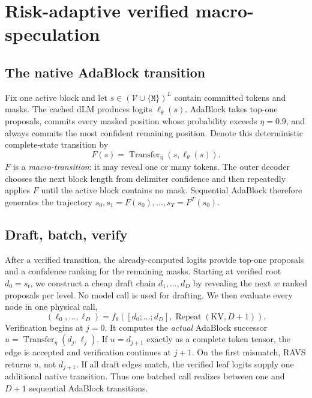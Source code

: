 \documentclass{article}
\newcommand{\method}{\textsc{RAVS}\xspace}
\begin{document}
\section{Risk-adaptive verified macro-speculation}

\subsection{The native AdaBlock transition}

Fix one active block and let $s\in(\mathcal V\cup\{\mathtt{M}\})^L$ contain committed tokens and
masks. The cached dLM produces logits $\ell_\theta(s)$. AdaBlock takes top-one proposals, commits
every masked position whose probability exceeds $\eta=0.9$, and always commits the most confident
remaining position. Denote this deterministic complete-state transition by
\begin{equation}
 F(s)=\operatorname{Transfer}_{\eta}\!\left(s,\ell_\theta(s)\right).
 \label{eq:transition}
\end{equation}
$F$ is a \emph{macro-transition}: it may reveal one or many tokens. The outer decoder chooses the
next block length from delimiter confidence and then repeatedly applies $F$ until the active block
contains no mask. Sequential AdaBlock therefore generates the trajectory
$s_0,s_1=F(s_0),\ldots,s_T=F^T(s_0)$.

\subsection{Draft, batch, verify}

After a verified transition, the already-computed logits provide top-one proposals and a confidence
ranking for the remaining masks. Starting at verified root $d_0=s_t$, we construct a cheap draft
chain $d_1,\ldots,d_D$ by revealing the next $w$ ranked proposals per level. No model call is used
for drafting. We then evaluate every node in one physical call,
\begin{equation}
 (\ell_0,\ldots,\ell_D)=
 f_\theta\!\left([d_0;\ldots;d_D],\operatorname{Repeat}(\mathrm{KV},D+1)\right).
 \label{eq:batch-verify}
\end{equation}
Verification begins at $j=0$. It computes the \emph{actual} AdaBlock successor
$u=\operatorname{Transfer}_\eta(d_j,\ell_j)$. If $u=d_{j+1}$ exactly as a complete token tensor,
the edge is accepted and verification continues at $j+1$. On the first mismatch, \method returns
$u$, not $d_{j+1}$. If all draft edges match, the verified leaf logits supply one additional native
transition. Thus one batched call realizes between one and $D+1$ sequential AdaBlock transitions.
\end{document}

